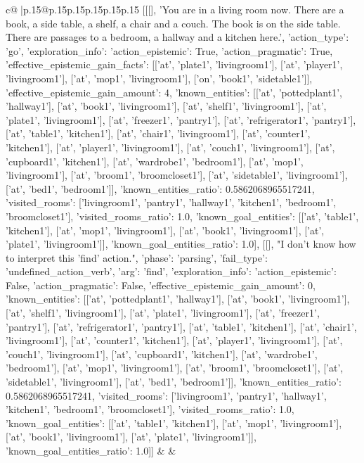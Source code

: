 \documentclass{article}
\begin{document}
{\begin{supertabular}{c@{$\;$}|p{.15\linewidth}@{}p{.15\linewidth}p{.15\linewidth}p{.15\linewidth}p{.15\linewidth}p{.15\linewidth}}
{{{	 [[[], 'You are in a living room now. There are a book, a side table, a shelf, a chair and a couch. The book is on the side table. There are passages to a bedroom, a hallway and a kitchen here.', {'action_type': 'go', 'exploration_info': {'action_epistemic': True, 'action_pragmatic': True, 'effective_epistemic_gain_facts': [['at', 'plate1', 'livingroom1'], ['at', 'player1', 'livingroom1'], ['at', 'mop1', 'livingroom1'], ['on', 'book1', 'sidetable1']], 'effective_epistemic_gain_amount': 4, 'known_entities': [['at', 'pottedplant1', 'hallway1'], ['at', 'book1', 'livingroom1'], ['at', 'shelf1', 'livingroom1'], ['at', 'plate1', 'livingroom1'], ['at', 'freezer1', 'pantry1'], ['at', 'refrigerator1', 'pantry1'], ['at', 'table1', 'kitchen1'], ['at', 'chair1', 'livingroom1'], ['at', 'counter1', 'kitchen1'], ['at', 'player1', 'livingroom1'], ['at', 'couch1', 'livingroom1'], ['at', 'cupboard1', 'kitchen1'], ['at', 'wardrobe1', 'bedroom1'], ['at', 'mop1', 'livingroom1'], ['at', 'broom1', 'broomcloset1'], ['at', 'sidetable1', 'livingroom1'], ['at', 'bed1', 'bedroom1']], 'known_entities_ratio': 0.5862068965517241, 'visited_rooms': ['livingroom1', 'pantry1', 'hallway1', 'kitchen1', 'bedroom1', 'broomcloset1'], 'visited_rooms_ratio': 1.0, 'known_goal_entities': [['at', 'table1', 'kitchen1'], ['at', 'mop1', 'livingroom1'], ['at', 'book1', 'livingroom1'], ['at', 'plate1', 'livingroom1']], 'known_goal_entities_ratio': 1.0}}], [[], "I don't know how to interpret this 'find' action.", {'phase': 'parsing', 'fail_type': 'undefined_action_verb', 'arg': 'find', 'exploration_info': {'action_epistemic': False, 'action_pragmatic': False, 'effective_epistemic_gain_amount': 0, 'known_entities': [['at', 'pottedplant1', 'hallway1'], ['at', 'book1', 'livingroom1'], ['at', 'shelf1', 'livingroom1'], ['at', 'plate1', 'livingroom1'], ['at', 'freezer1', 'pantry1'], ['at', 'refrigerator1', 'pantry1'], ['at', 'table1', 'kitchen1'], ['at', 'chair1', 'livingroom1'], ['at', 'counter1', 'kitchen1'], ['at', 'player1', 'livingroom1'], ['at', 'couch1', 'livingroom1'], ['at', 'cupboard1', 'kitchen1'], ['at', 'wardrobe1', 'bedroom1'], ['at', 'mop1', 'livingroom1'], ['at', 'broom1', 'broomcloset1'], ['at', 'sidetable1', 'livingroom1'], ['at', 'bed1', 'bedroom1']], 'known_entities_ratio': 0.5862068965517241, 'visited_rooms': ['livingroom1', 'pantry1', 'hallway1', 'kitchen1', 'bedroom1', 'broomcloset1'], 'visited_rooms_ratio': 1.0, 'known_goal_entities': [['at', 'table1', 'kitchen1'], ['at', 'mop1', 'livingroom1'], ['at', 'book1', 'livingroom1'], ['at', 'plate1', 'livingroom1']], 'known_goal_entities_ratio': 1.0}}]] 
	  } 
	   } 
	   } 
	 & & \\ 
 


\end{supertabular}}
\end{document}
